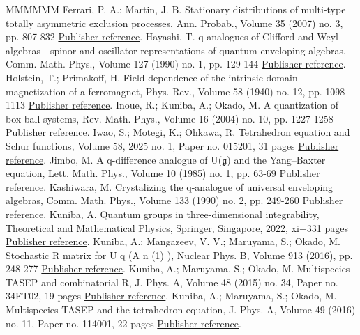 \documentclass[11pt]{article}
\theoremstyle{definition}
\numberwithin{equation}{section}
\begin{document}
\begin{thebibliography}{MMMMMM}
 Ferrari, P. A.; Martin, J. B. Stationary distributions of multi-type totally asymmetric exclusion processes, Ann. Probab., Volume 35 (2007) no. 3, pp. 807-832 \href{https://alco.centre-mersenne.org/articles/10.5802/alco.457/#FM}{Publisher reference}.
 Hayashi, T. q-analogues of Clifford and Weyl algebras—spinor and oscillator representations of quantum enveloping algebras, Comm. Math. Phys., Volume 127 (1990) no. 1, pp. 129-144 \href{https://alco.centre-mersenne.org/articles/10.5802/alco.457/#Hayashi90}{Publisher reference}.
 Holstein, T.; Primakoff, H. Field dependence of the intrinsic domain magnetization of a ferromagnet, Phys. Rev., Volume 58 (1940) no. 12, pp. 1098-1113 \href{https://alco.centre-mersenne.org/articles/10.5802/alco.457/#HP}{Publisher reference}.
 Inoue, R.; Kuniba, A.; Okado, M. A quantization of box-ball systems, Rev. Math. Phys., Volume 16 (2004) no. 10, pp. 1227-1258 \href{https://alco.centre-mersenne.org/articles/10.5802/alco.457/#IKO}{Publisher reference}.
 Iwao, S.; Motegi, K.; Ohkawa, R. Tetrahedron equation and Schur functions, Volume 58, 2025 no. 1, Paper no. 015201, 31 pages \href{https://alco.centre-mersenne.org/articles/10.5802/alco.457/#IMO}{Publisher reference}.
 Jimbo, M. A q-difference analogue of U(\(\mathfrak{g}\)) and the Yang–Baxter equation, Lett. Math. Phys., Volume 10 (1985) no. 1, pp. 63-69 \href{https://alco.centre-mersenne.org/articles/10.5802/alco.457/#J1}{Publisher reference}.
 Kashiwara, M. Crystalizing the q-analogue of universal enveloping algebras, Comm. Math. Phys., Volume 133 (1990) no. 2, pp. 249-260 \href{https://alco.centre-mersenne.org/articles/10.5802/alco.457/#Kashiwara90}{Publisher reference}.
 Kuniba, A. Quantum groups in three-dimensional integrability, Theoretical and Mathematical Physics, Springer, Singapore, 2022, xi+331 pages \href{https://alco.centre-mersenne.org/articles/10.5802/alco.457/#K22}{Publisher reference}.
 Kuniba, A.; Mangazeev, V. V.; Maruyama, S.; Okado, M. Stochastic R matrix for U q (A n (1) ), Nuclear Phys. B, Volume 913 (2016), pp. 248-277 \href{https://alco.centre-mersenne.org/articles/10.5802/alco.457/#KMMO}{Publisher reference}.
 Kuniba, A.; Maruyama, S.; Okado, M. Multispecies TASEP and combinatorial R, J. Phys. A, Volume 48 (2015) no. 34, Paper no. 34FT02, 19 pages \href{https://alco.centre-mersenne.org/articles/10.5802/alco.457/#KMO1}{Publisher reference}.
 Kuniba, A.; Maruyama, S.; Okado, M. Multispecies TASEP and the tetrahedron equation, J. Phys. A, Volume 49 (2016) no. 11, Paper no. 114001, 22 pages \href{https://alco.centre-mersenne.org/articles/10.5802/alco.457/#KMO2}{Publisher reference}.

\end{thebibliography}
\end{document}
